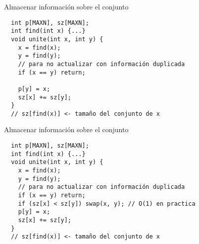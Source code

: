 \documentclass[10pt]{beamer}
\begin{document}
\begin{frame}[fragile]{Almacenar información sobre el conjunto}
  \begin{verbatim}
  int p[MAXN], sz[MAXN];
  int find(int x) {...}
  void unite(int x, int y) {
    x = find(x);
    y = find(y);
    // para no actualizar con información duplicada
    if (x == y) return; 

    p[y] = x;
    sz[x] += sz[y];
  }
  // sz[find(x)] <- tamaño del conjunto de x
  \end{verbatim}
\end{frame}

\begin{frame}[fragile]{Almacenar información sobre el conjunto}
  \begin{verbatim}
  int p[MAXN], sz[MAXN];
  int find(int x) {...}
  void unite(int x, int y) {
    x = find(x);
    y = find(y);
    // para no actualizar con información duplicada
    if (x == y) return; 
    if (sz[x] < sz[y]) swap(x, y); // O(1) en practica
    p[y] = x;
    sz[x] += sz[y];
  }
  // sz[find(x)] <- tamaño del conjunto de x
  \end{verbatim}
\end{frame}
\end{document}
